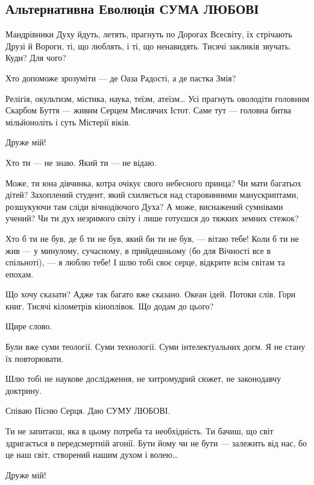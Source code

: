  
 

\subsection{Альтернативна Еволюція СУМА ЛЮБОВІ}

Мандрівники Духу йдуть, летять, прагнуть по Дорогах Всесвіту, їх стрічають
Друзі й Вороги, ті, що люблять, і ті, що ненавидять. Тисячі закликів звучать.
Куди? Для чого?

Хто допоможе зрозуміти — де Оаза Радості, а де пастка Змія?

Релігія, окультизм, містика, наука, теїзм, атеїзм… Усі прагнуть оволодіти
головним Скарбом Буття — живим Серцем Мислячих Істот. Саме тут — головна битва
мільйоноліть і суть Містерії віків.

Друже мій!

Хто ти — не знаю. Який ти — не відаю.

Може, ти юна дівчинка, котра очікує свого небесного принца? Чи мати багатьох
дітей? Захоплений студент, який схиляється над старовинними манускриптами,
розшукуючи там сліди вічнодіючого Духа? А може, виснажений сумнівами учений? Чи
ти дух незримого світу і лише готуєшся до тяжких земних стежок?

Хто б ти не був, де б ти не був, який би ти не був, — вітаю тебе! Коли б ти не
жив — у минулому, сучасному, в прийдешньому (бо для Вічності все в спільноті),
— я люблю тебе! І шлю тобі своє серце, відкрите всім світам та епохам.

Що хочу сказати? Адже так багато вже сказано. Океан ідей. Потоки слів. Гори
книг. Тисячі кілометрів кіноплівок. Що додам до цього?

Щире слово.

Були вже суми теології. Суми технології. Суми інтелектуальних догм. Я не стану
їх повторювати.

Шлю тобі не наукове дослідження, не хитромудрий сюжет, не законодавчу доктрину.

Співаю Пісню Серця. Даю СУМУ ЛЮБОВІ.

Ти не запитаєш, яка в цьому потреба та необхідність. Ти бачиш, що світ
здригається в передсмертній агонії. Бути йому чи не бути — залежить від нас, бо
це наш світ, створений нашим духом і волею…

Друже мій!

